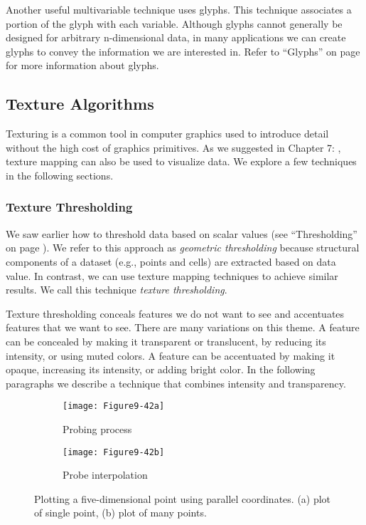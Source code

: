 Another useful multivariable technique uses glyphs. This technique associates a portion of the glyph with each variable. Although glyphs cannot generally be designed for arbitrary n-dimensional data, in many applications we can create glyphs to convey the information we are interested in. Refer to ``Glyphs'' on page \pageref{subsec:glyphs} for more information about glyphs.

\subsection{Texture Algorithms}
\label{subsec:texture_algorithms}

Texturing is a common tool in computer graphics used to introduce detail without the high cost of graphics primitives. As we suggested in Chapter 7: , texture mapping can also be used to visualize data. We explore a few techniques in the following sections.

\subsubsection{Texture Thresholding}

We saw earlier how to threshold data based on scalar values (see ``Thresholding'' on page \pageref{subsubsec:thresholding}). We refer to this approach as \emph{geometric thresholding} because structural components of a dataset (e.g., points and cells) are extracted based on data value. In contrast, we can use texture mapping techniques to achieve similar results. We call this technique \emph{texture thresholding}.

Texture thresholding conceals features we do not want to see and accentuates features that we want to see. There are many variations on this theme. A feature can be concealed by making it transparent or translucent, by reducing its intensity, or using muted colors. A feature can be accentuated by making it opaque, increasing its intensity, or adding bright color. In the following paragraphs we describe a technique that combines intensity and transparency.

\begin{figure}[htb]
	\begin{subfigure}[h]{0.48\linewidth}
		\texttt{[image: Figure9-42a]}
		\captionsetup{justification=centering}
		\caption{Probing process}
		\label{fig:Figure9-42a}
	\end{subfigure}
	\hfill
	\begin{subfigure}[h]{0.48\linewidth}
		\texttt{[image: Figure9-42b]}
		\captionsetup{justification=centering}
		\caption{Probe interpolation}
		\label{fig:Figure9-42b}
	\end{subfigure}
	\caption{Plotting a five-dimensional point using parallel coordinates. (a) plot of single point, (b) plot of many points.}\label{fig:Figure9-42}
\end{figure}

